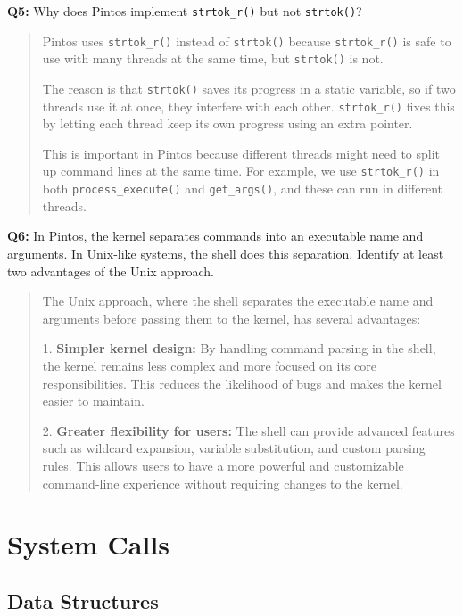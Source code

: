 \documentclass[a4paper,11pt]{paper}
\begin{document}
\textbf{Q5:} Why does Pintos implement \texttt{strtok\_r()} but not \texttt{strtok()}?
\begin{quote}
Pintos uses \texttt{strtok\_r()} instead of \texttt{strtok()} because \texttt{strtok\_r()} is safe to use with many threads at the same time, but \texttt{strtok()} is not.

The reason is that \texttt{strtok()} saves its progress in a static variable, so if two threads use it at once, they interfere with each other. \texttt{strtok\_r()} fixes this by letting each thread keep its own progress using an extra pointer.

This is important in Pintos because different threads might need to split up command lines at the same time. For example, we use \texttt{strtok\_r()} in both \texttt{process\_execute()} and \texttt{get\_args()}, and these can run in different threads.
\end{quote}

\textbf{Q6:} In Pintos, the kernel separates commands into an executable name and arguments.  In Unix-like systems, the shell does this separation.  Identify at least two advantages of the Unix approach.
\begin{quote}
The Unix approach, where the shell separates the executable name and arguments before passing them to the kernel, has several advantages:

1. \textbf{Simpler kernel design:} By handling command parsing in the shell, the kernel remains less complex and more focused on its core responsibilities. This reduces the likelihood of bugs and makes the kernel easier to maintain.

2. \textbf{Greater flexibility for users:} The shell can provide advanced features such as wildcard expansion, variable substitution, and custom parsing rules. This allows users to have a more powerful and customizable command-line experience without requiring changes to the kernel.

\end{quote}


\section{System Calls}

\subsection{Data Structures}
\end{document}
